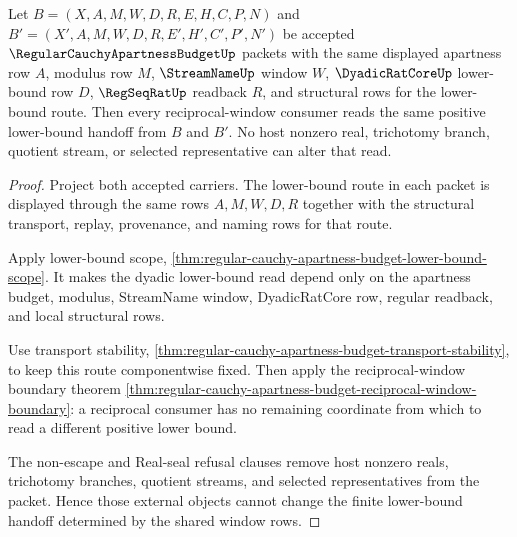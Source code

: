 \begin{theorem}
\label{thm:regular-cauchy-apartness-budget-positive-window-determinacy}
Let $B=(X,A,M,W,D,R,E,H,C,P,N)$ and $B'=(X',A,M,W,D,R,E',H',C',P',N')$ be accepted $\RegularCauchyApartnessBudgetUp$ packets with the same displayed apartness row $A$, modulus row $M$, $\StreamNameUp$ window $W$, $\DyadicRatCoreUp$ lower-bound row $D$, $\RegSeqRatUp$ readback $R$, and structural rows for the lower-bound route. Then every reciprocal-window consumer reads the same positive lower-bound handoff from $B$ and $B'$. No host nonzero real, trichotomy branch, quotient stream, or selected representative can alter that read.
\end{theorem}
\begin{proof}
Project both accepted carriers. The lower-bound route in each packet is displayed through the same rows $A,M,W,D,R$ together with the structural transport, replay, provenance, and naming rows for that route.

Apply lower-bound scope, \autoref{thm:regular-cauchy-apartness-budget-lower-bound-scope}. It makes the dyadic lower-bound read depend only on the apartness budget, modulus, StreamName window, DyadicRatCore row, regular readback, and local structural rows.

Use transport stability, \autoref{thm:regular-cauchy-apartness-budget-transport-stability}, to keep this route componentwise fixed. Then apply the reciprocal-window boundary theorem \autoref{thm:regular-cauchy-apartness-budget-reciprocal-window-boundary}: a reciprocal consumer has no remaining coordinate from which to read a different positive lower bound.

The non-escape and Real-seal refusal clauses remove host nonzero reals, trichotomy branches, quotient streams, and selected representatives from the packet. Hence those external objects cannot change the finite lower-bound handoff determined by the shared window rows.
\end{proof}

